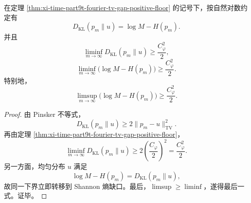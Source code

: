 \begin{corollary}\label{cor:xi-time-part9t-fourier-kl-shannon-gap-positive-floor}
在定理 \ref{thm:xi-time-part9t-fourier-tv-gap-positive-floor} 的记号下，按自然对数约定有
\[
D_{\mathrm{KL}}(p_m\|u)=\log M-H(p_m).
\]
并且
\[
\liminf_{m\to\infty}D_{\mathrm{KL}}(p_m\|u)
\ge
\frac{C_\varphi^2}{2},
\]
\[
\liminf_{m\to\infty}\bigl(\log M-H(p_m)\bigr)
\ge
\frac{C_\varphi^2}{2}.
\]
特别地，
\[
\limsup_{m\to\infty}\bigl(\log M-H(p_m)\bigr)
\ge
\frac{C_\varphi^2}{2}.
\]
\end{corollary}
\begin{proof}
由 Pinsker 不等式，
\[
D_{\mathrm{KL}}(p_m\|u)\ge 2\|p_m-u\|_{\mathrm{TV}}^2.
\]
再由定理 \ref{thm:xi-time-part9t-fourier-tv-gap-positive-floor}，
\[
\liminf_{m\to\infty}D_{\mathrm{KL}}(p_m\|u)
\ge
2\left(\frac{C_\varphi}{2}\right)^2
=
\frac{C_\varphi^2}{2}.
\]
另一方面，均匀分布 \(u\) 满足
\[
\log M-H(p_m)=D_{\mathrm{KL}}(p_m\|u),
\]
故同一下界立即转移到 Shannon 熵缺口。最后，\(\limsup\ge\liminf\)，遂得最后一式。证毕。
\end{proof}

